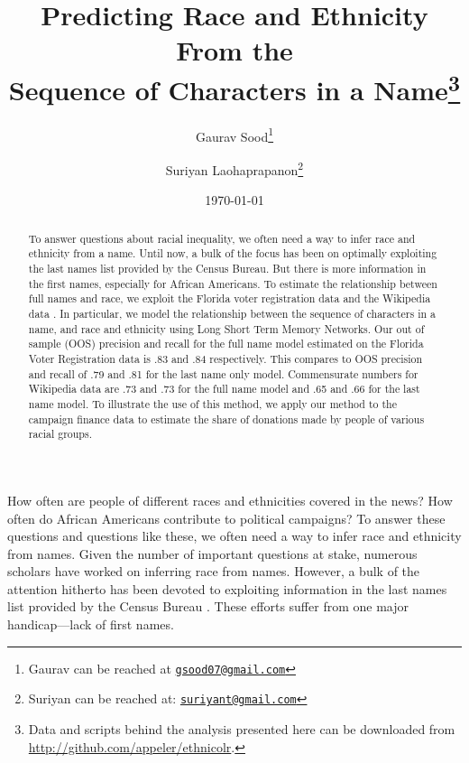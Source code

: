\documentclass[12pt, letterpaper]{article}
\title{\Large{Predicting Race and Ethnicity From the\\Sequence of Characters in a Name}\footnote{Data and scripts behind the analysis presented here can be downloaded from \url{http://github.com/appeler/ethnicolr}.
}}
\author{Gaurav Sood\thanks{Gaurav can be reached at \href{mailto:gsood07@gmail.com}{\footnotesize{\texttt{gsood07@gmail.com}}}} \and Suriyan Laohaprapanon\thanks{Suriyan can be reached at: \href{mailto:suriyant@gmail.com}{\footnotesize{\texttt{suriyant@gmail.com}}}}\vspace{.5cm}}
\date{\vspace{.5cm}\normalsize{\today}}
\begin{document}
\maketitle

\begin{center}
\end{center}

\begin{comment}

setwd(paste0(githubdir, "ethnicolr_paper/"))
tools::texi2dvi("name_race.tex", pdf = TRUE, clean = TRUE) 
setwd(basedir)

\end{comment}


\begin{abstract}
To answer questions about racial inequality, we often need a way to infer race and ethnicity from a name. Until now, a bulk of the focus has been on optimally exploiting the last names list provided by the Census Bureau. But there is more information in the first names, especially for African Americans. To estimate the relationship between full names and race, we exploit the Florida voter registration data and the Wikipedia data \citep{ambekar2009name}. In particular, we model the relationship between the sequence of characters in a name, and race and ethnicity using Long Short Term Memory Networks. Our out of sample (OOS) precision and recall for the full name model estimated on the Florida Voter Registration data is .83 and .84 respectively. This compares to OOS precision and recall of .79 and .81 for the last name only model. Commensurate numbers for Wikipedia data are .73 and .73 for the full name model and .65 and .66 for the last name model. To illustrate the use of this method, we apply our method to the campaign finance data to estimate the share of donations made by people of various racial groups.
\end{abstract}
\clearpage
\doublespace

How often are people of different races and ethnicities covered in the news? How often do African Americans contribute to political campaigns? To answer these questions and questions like these, we often need a way to infer race and ethnicity from names. Given the number of important questions at stake, numerous scholars have worked on inferring race from names. However, a bulk of the attention hitherto has been devoted to exploiting information in the last names list provided by the Census Bureau \citep[see, e.g.,][]{fiscella2006use, imai2016improving}. These efforts suffer from one major handicap---lack of first names. 
\end{document}
